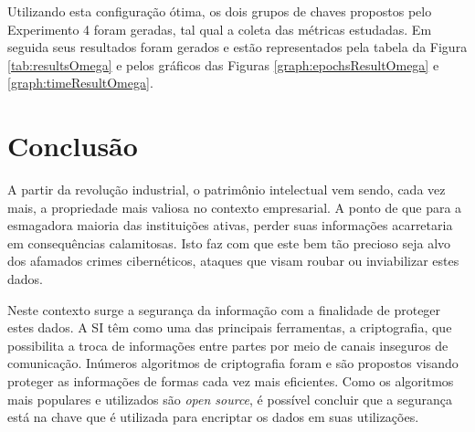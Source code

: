 \documentclass[a4paper,10pt,oneside,conference,final,keeplastbox]{inatel}
\begin{document}
                Utilizando esta configuração ótima, os dois grupos de chaves propostos pelo Experimento 4 foram geradas, tal qual a coleta das métricas estudadas. Em seguida seus resultados foram gerados e estão representados pela tabela da Figura \ref{tab:resultsOmega} e pelos gráficos das Figuras \ref{graph:epochsResultOmega} e \ref{graph:timeResultOmega}.
                
                \clearpage
                \newpage
                
                

                

                
                
                \clearpage
                \newpage
  
    \section{Conclusão}
    \label{sec:conclusao}
    
        A partir da revolução industrial, o patrimônio intelectual vem sendo, cada vez mais, a propriedade mais valiosa no contexto empresarial. A ponto de que para a esmagadora maioria das instituições ativas, perder suas informações acarretaria em consequências calamitosas. Isto faz com que este bem tão precioso seja alvo dos afamados crimes cibernéticos, ataques que visam roubar ou inviabilizar estes dados.

        Neste contexto surge a segurança da informação com a finalidade de proteger estes dados. A SI têm como uma das principais ferramentas, a criptografia, que possibilita a troca de informações entre partes por meio de canais inseguros de comunicação. Inúmeros algoritmos de criptografia foram e são propostos visando proteger as informações de formas cada vez mais eficientes. Como os algoritmos mais populares e utilizados são \textit{open source}, é possível concluir que a segurança está na chave que é utilizada para encriptar os dados em suas utilizações.
\end{document}
